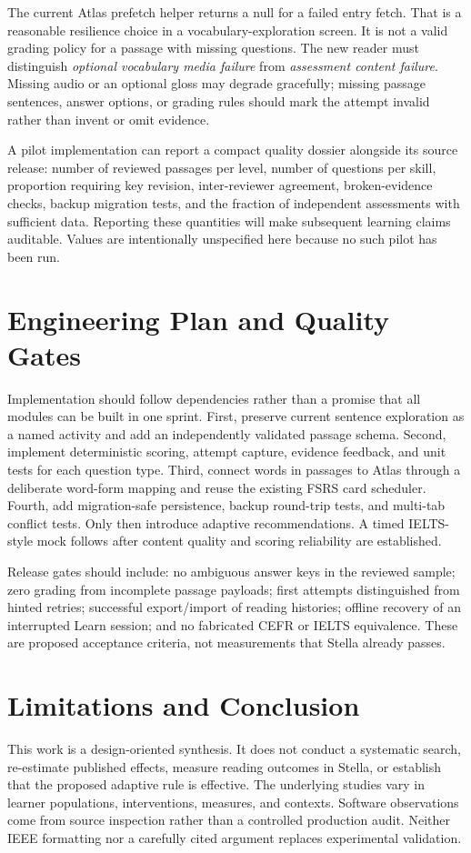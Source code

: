 \documentclass[conference,10pt]{IEEEtran}
\begin{document}
The current Atlas prefetch helper returns a null for a failed entry fetch. That is a reasonable resilience choice in a vocabulary-exploration screen. It is not a valid grading policy for a passage with missing questions. The new reader must distinguish \emph{optional vocabulary media failure} from \emph{assessment content failure}. Missing audio or an optional gloss may degrade gracefully; missing passage sentences, answer options, or grading rules should mark the attempt invalid rather than invent or omit evidence.

A pilot implementation can report a compact quality dossier alongside its source release: number of reviewed passages per level, number of questions per skill, proportion requiring key revision, inter-reviewer agreement, broken-evidence checks, backup migration tests, and the fraction of independent assessments with sufficient data. Reporting these quantities will make subsequent learning claims auditable. Values are intentionally unspecified here because no such pilot has been run.

\section{Engineering Plan and Quality Gates}
Implementation should follow dependencies rather than a promise that all modules can be built in one sprint. First, preserve current sentence exploration as a named activity and add an independently validated passage schema. Second, implement deterministic scoring, attempt capture, evidence feedback, and unit tests for each question type. Third, connect words in passages to Atlas through a deliberate word-form mapping and reuse the existing FSRS card scheduler. Fourth, add migration-safe persistence, backup round-trip tests, and multi-tab conflict tests. Only then introduce adaptive recommendations. A timed IELTS-style mock follows after content quality and scoring reliability are established.

Release gates should include: no ambiguous answer keys in the reviewed sample; zero grading from incomplete passage payloads; first attempts distinguished from hinted retries; successful export/import of reading histories; offline recovery of an interrupted Learn session; and no fabricated CEFR or IELTS equivalence. These are proposed acceptance criteria, not measurements that Stella already passes.

\section{Limitations and Conclusion}
This work is a design-oriented synthesis. It does not conduct a systematic search, re-estimate published effects, measure reading outcomes in Stella, or establish that the proposed adaptive rule is effective. The underlying studies vary in learner populations, interventions, measures, and contexts. Software observations come from source inspection rather than a controlled production audit. Neither IEEE formatting nor a carefully cited argument replaces experimental validation.
\end{document}
